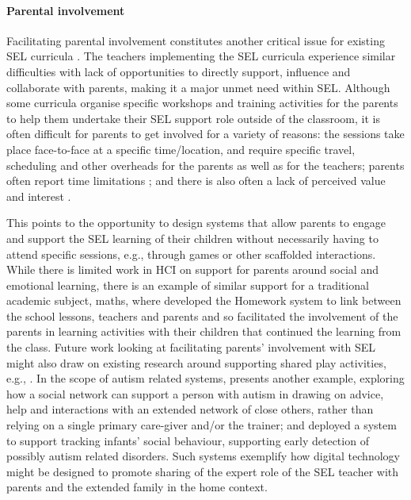 \documentclass[prodmode,acmtochi]{acmsmall}
\begin{document}
\paragraph{Parental involvement} Facilitating parental involvement  constitutes another critical issue for existing SEL curricula \cite{Patrikakou2005}. The teachers implementing the SEL curricula experience similar difficulties with lack of opportunities to directly support, influence and collaborate with parents, making it a major unmet need within SEL. Although some curricula organise specific workshops and training activities for the parents to help them undertake their SEL support role outside of the classroom, it is often difficult for parents to get involved for a variety of reasons: the sessions take place face-to-face at a specific time/location, and require specific travel, scheduling and other overheads for the parents as well as for the teachers; parents often report time limitations \cite{Bender2011}; and there is also often a lack of perceived value and interest \cite{Lewin2010}. 

This points to the opportunity to design systems that allow parents to engage and support the SEL learning of their children without necessarily having to attend specific sessions, e.g., through games or other scaffolded interactions. While there is limited work in HCI on support for parents around social and emotional learning, there is an example of similar support for a traditional academic subject, maths,  where   developed the Homework system to link between the school lessons, teachers and parents and so facilitated the involvement of the parents in learning activities with their children that continued the learning from the class. Future work looking at facilitating parents' involvement with SEL might also draw on existing research around supporting shared play activities, e.g., \cite{Raffle2010}. In the scope of autism related systems,  presents another example, exploring how a social network can support a person with autism in drawing on advice, help and interactions with an extended network of close others, rather than relying on a single primary care-giver and/or the trainer; and  deployed a system to support tracking infants' social behaviour, supporting early detection of possibly autism related disorders. Such systems exemplify how digital technology might be designed to promote sharing of the expert role of the SEL teacher with parents and the extended family in the home context. 
\end{document}
